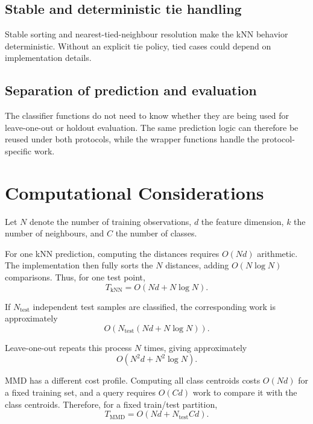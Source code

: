 \documentclass[11pt,a4paper]{article}
\begin{document}
\subsection{Stable and deterministic tie handling}

Stable sorting and nearest-tied-neighbour resolution make the kNN behavior deterministic. Without an explicit tie policy, tied cases could depend on implementation details.

\subsection{Separation of prediction and evaluation}

The classifier functions do not need to know whether they are being used for leave-one-out or holdout evaluation. The same prediction logic can therefore be reused under both protocols, while the wrapper functions handle the protocol-specific work.

\section{Computational Considerations}

Let $N$ denote the number of training observations, $d$ the feature dimension, $k$ the number of neighbours, and $C$ the number of classes.

For one kNN prediction, computing the distances requires $O(Nd)$ arithmetic. The implementation then fully sorts the $N$ distances, adding $O(N\log N)$ comparisons. Thus, for one test point,
\begin{equation}
 T_{\mathrm{kNN}}=O(Nd+N\log N).
\end{equation}

If $N_{\mathrm{test}}$ independent test samples are classified, the corresponding work is approximately
\begin{equation}
 O\left(N_{\mathrm{test}}(Nd+N\log N)\right).
\end{equation}

Leave-one-out repeats this process $N$ times, giving approximately
\begin{equation}
 O(N^2d+N^2\log N).
\end{equation}

MMD has a different cost profile. Computing all class centroids costs $O(Nd)$ for a fixed training set, and a query requires $O(Cd)$ work to compare it with the class centroids. Therefore, for a fixed train/test partition,
\begin{equation}
 T_{\mathrm{MMD}}=O(Nd+N_{\mathrm{test}}Cd).
\end{equation}
\end{document}

